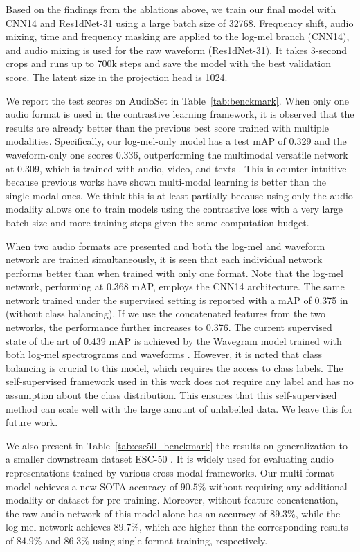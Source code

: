 \documentclass{article}
\begin{document}
Based on the findings from the ablations above, we train our final model with CNN14 and Res1dNet-31 using a large batch size of 32768. Frequency shift, audio mixing, time and frequency masking are applied to the log-mel branch (CNN14), and audio mixing is used for the raw waveform (Res1dNet-31). It takes 3-second crops and runs up to 700k steps and save the model with the best validation score. The latent size in the projection head is 1024.

We report the test scores on AudioSet in Table~\ref{tab:benckmark}. When only one audio format is used in the contrastive learning framework, it is observed that the results are already better than the previous best score trained with multiple modalities. Specifically, our log-mel-only model has a test mAP of 0.329 and the waveform-only one scores 0.336, outperforming the multimodal versatile network at 0.309, which is trained with audio, video, and texts \cite{alayrac2020self}. This is counter-intuitive because previous works have shown multi-modal learning is better than the single-modal ones. We think this is at least partially because using only the audio modality allows one to train models using the contrastive loss with a very large batch size and more training steps given the same computation budget.

When two audio formats are presented and both the log-mel and waveform network are trained simultaneously, it is seen that each individual network performs better than when trained with only one format. Note that the log-mel network, performing at 0.368 mAP, employs the CNN14 architecture. The same network trained under the supervised setting is reported with a mAP of 0.375 in \cite{kong2020panns} (without class balancing). If we use the  concatenated features from the two networks, the performance further increases to 0.376. The current supervised state of the art of 0.439 mAP is achieved by the Wavegram model trained with both log-mel spectrograms and waveforms \cite{kong2020panns}. However, it is noted that class balancing is crucial to this model, which requires the access to class labels. The self-supervised framework used in this work does not require any label and has no assumption about the class distribution. This ensures that this self-supervised method can scale well with the large amount of unlabelled data. We leave this for future work.

We also present in Table~\ref{tab:esc50_benckmark} the results on generalization to a smaller downstream dataset ESC-50 \cite{piczak2015esc}. It is widely used for evaluating audio representations trained by various cross-modal frameworks. Our multi-format model achieves a new SOTA accuracy of $90.5\%$ without requiring any additional modality or dataset for pre-training. Moreover, without feature concatenation, the raw audio network of this model alone has an accuracy of $89.3\%$, while the log mel network achieves $89.7\%$, which are higher than the corresponding results of $84.9\%$ and $86.3\%$ using single-format training, respectively.
\end{document}
